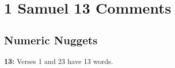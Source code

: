 \section{1 Samuel 13 Comments}

\subsection{Numeric Nuggets}
\textbf{13: } Verses 1 and 23 have 13 words. 
